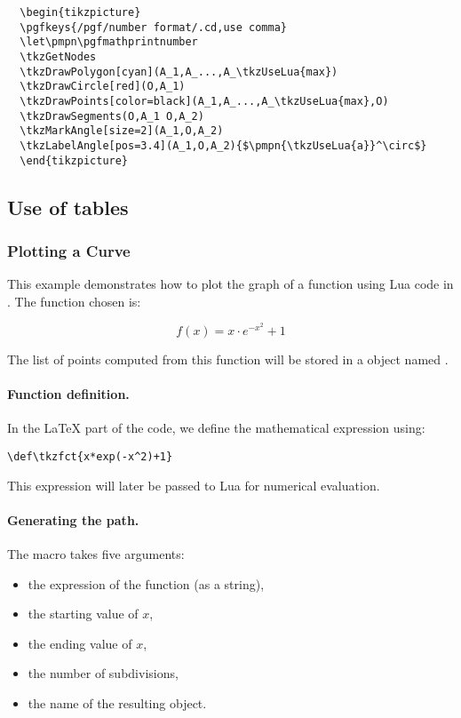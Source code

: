 \begin{verbatim}
  \begin{tikzpicture}
  \pgfkeys{/pgf/number format/.cd,use comma}
  \let\pmpn\pgfmathprintnumber
  \tkzGetNodes
  \tkzDrawPolygon[cyan](A_1,A_...,A_\tkzUseLua{max})
  \tkzDrawCircle[red](O,A_1)
  \tkzDrawPoints[color=black](A_1,A_...,A_\tkzUseLua{max},O)
  \tkzDrawSegments(O,A_1 O,A_2)
  \tkzMarkAngle[size=2](A_1,O,A_2)
  \tkzLabelAngle[pos=3.4](A_1,O,A_2){$\pmpn{\tkzUseLua{a}}^\circ$}
  \end{tikzpicture}
\end{verbatim}

\subsection{Use of tables}
\label{sub:use_of_tables}




\subsubsection{Plotting a Curve}
\label{ssub:plotting_a_curve}

This example demonstrates how to plot the graph of a function using Lua code in . The function chosen is:

\[
f(x) = x\cdot e^{-x^2} + 1
\]

The list of points computed from this function will be stored in a  object named .

\paragraph{Function definition.}
In the \LaTeX{} part of the code, we define the mathematical expression using:

\begin{center}
\verb|\def\tkzfct{x*exp(-x^2)+1}|
\end{center}

This expression will later be passed to Lua for numerical evaluation.

\paragraph{Generating the path.}
The macro  takes five arguments:
\begin{itemize}
  \item the expression of the function (as a string),
  \item the starting value of $x$,
  \item the ending value of $x$,
  \item the number of subdivisions,
  \item the name of the resulting  object.
\end{itemize}

